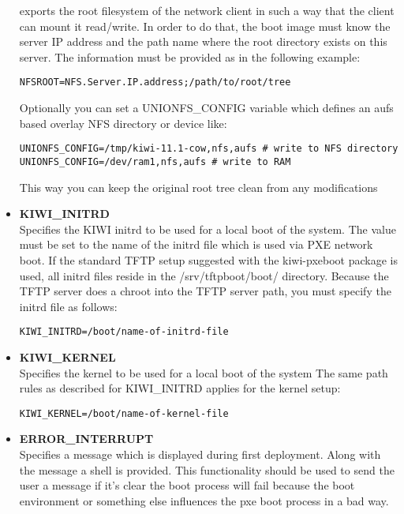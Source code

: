 \begin{itemize}
         exports the root filesystem of the network client in such a
         way that the client can mount it read/write. In order to do
         that, the boot image must know the server IP address and
         the path name where the root directory
         exists on this server. The information must be provided as
         in the following example:
\begin{verbatim}
NFSROOT=NFS.Server.IP.address;/path/to/root/tree
\end{verbatim}
         Optionally you can set a UNIONFS\_CONFIG variable which defines
         an aufs based overlay NFS directory or device like:
\begin{verbatim}
UNIONFS_CONFIG=/tmp/kiwi-11.1-cow,nfs,aufs # write to NFS directory
UNIONFS_CONFIG=/dev/ram1,nfs,aufs # write to RAM
\end{verbatim}
         This way you can keep the original root tree clean from any
         modifications
    \item \textbf{KIWI\_INITRD}\\
         Specifies the KIWI initrd to be used for a local boot of the system.
         The value must be set to the name of the initrd file which is
         used via PXE network boot. If the standard TFTP setup suggested
         with the kiwi-pxeboot package is used, all initrd files reside
         in the /srv/tftpboot/boot/ directory. Because the TFTP server
         does a chroot into the TFTP server path, you must specify the
         initrd file as follows:
\begin{verbatim}
KIWI_INITRD=/boot/name-of-initrd-file
\end{verbatim}
    \item \textbf{KIWI\_KERNEL}\\
         Specifies the kernel to be used for a local boot of the system
         The same path rules as described for KIWI\_INITRD applies for
         the kernel setup:
\begin{verbatim}
KIWI_KERNEL=/boot/name-of-kernel-file
\end{verbatim}
	\item \textbf{ERROR\_INTERRUPT}\\
         Specifies a message which is displayed during first deployment.
         Along with the message a shell is provided. This functionality
         should be used to send the user a message if it's clear the
         boot process will fail because the boot environment or something
         else influences the pxe boot process in a bad way.
\end{itemize}

